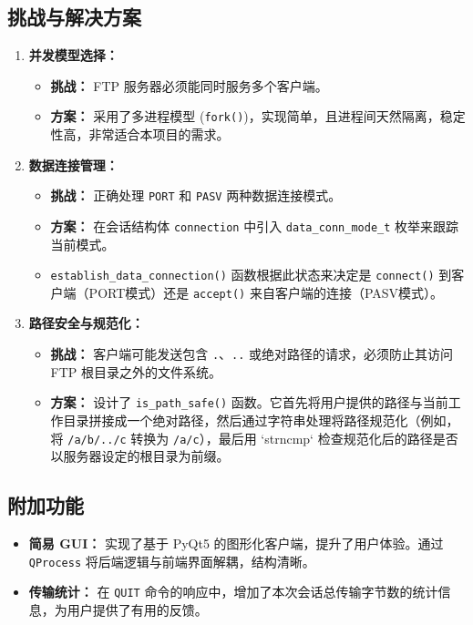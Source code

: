 \documentclass[a4paper,10pt]{article} %
\begin{document}
\subsection{挑战与解决方案}
\begin{enumerate}[label=\arabic*)]
    \item \textbf{并发模型选择：}
    \begin{itemize}
        \item \textbf{挑战：} FTP 服务器必须能同时服务多个客户端。
        \item \textbf{方案：} 采用了多进程模型 (\verb|fork()|)，实现简单，且进程间天然隔离，稳定性高，非常适合本项目的需求。
    \end{itemize}
    
    \item \textbf{数据连接管理：}
    \begin{itemize}
        \item \textbf{挑战：} 正确处理 \verb|PORT| 和 \verb|PASV| 两种数据连接模式。
        \item \textbf{方案：} 在会话结构体 \verb|connection| 中引入 \verb|data_conn_mode_t| 枚举来跟踪当前模式。
        \item 
        \verb|establish_data_connection()| 函数根据此状态来决定是 \verb|connect()| 到客户端（PORT模式）还是 \verb|accept()| 来自客户端的连接（PASV模式）。
    \end{itemize}

    \item \textbf{路径安全与规范化：}
    \begin{itemize}
        \item \textbf{挑战：} 客户端可能发送包含 \verb|.|、\verb|..| 或绝对路径的请求，必须防止其访问 FTP 根目录之外的文件系统。
        \item \textbf{方案：} 设计了 \verb|is_path_safe()| 函数。它首先将用户提供的路径与当前工作目录拼接成一个绝对路径，然后通过字符串处理将路径规范化（例如，将 \verb|/a/b/../c| 转换为 \verb|/a/c|），最后用 `strncmp` 检查规范化后的路径是否以服务器设定的根目录为前缀。
    \end{itemize}
\end{enumerate}

\subsection{附加功能}
\begin{itemize}
    \item \textbf{简易 GUI：} 实现了基于 PyQt5 的图形化客户端，提升了用户体验。通过 \verb|QProcess| 将后端逻辑与前端界面解耦，结构清晰。
    \item \textbf{传输统计：} 在 \verb|QUIT| 命令的响应中，增加了本次会话总传输字节数的统计信息，为用户提供了有用的反馈。
\end{itemize}
\end{document}
